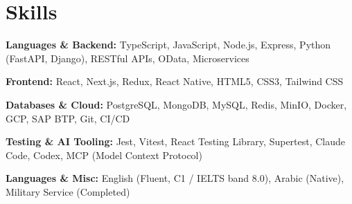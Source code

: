 \section{Skills}

\begin{onecolentry}
    \textbf{Languages \& Backend:} TypeScript, JavaScript, Node.js, Express, Python (FastAPI, Django), RESTful APIs, OData, Microservices
\end{onecolentry}

\vspace{0.06 cm}

\begin{onecolentry}
    \textbf{Frontend:} React, Next.js, Redux, React Native, HTML5, CSS3, Tailwind CSS
\end{onecolentry}

\vspace{0.06 cm}

\begin{onecolentry}
    \textbf{Databases \& Cloud:} PostgreSQL, MongoDB, MySQL, Redis, MinIO, Docker, GCP, SAP BTP, Git, CI/CD
\end{onecolentry}

\vspace{0.06 cm}

\begin{onecolentry}
    \textbf{Testing \& AI Tooling:} Jest, Vitest, React Testing Library, Supertest, Claude Code, Codex, MCP (Model Context Protocol)
\end{onecolentry}

\vspace{0.06 cm}

\begin{onecolentry}
    \textbf{Languages \& Misc:} English (Fluent, C1 / IELTS band 8.0), Arabic (Native), Military Service (Completed)
\end{onecolentry}
